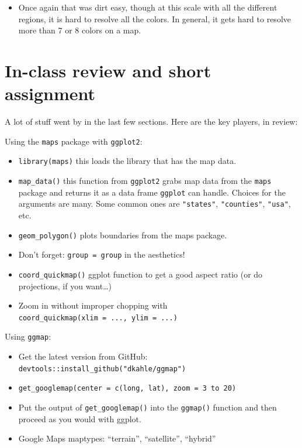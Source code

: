 \documentclass[]{book}
\providecommand{\tightlist}{%
  \setlength{\itemsep}{0pt}\setlength{\parskip}{0pt}}
\theoremstyle{definition}
\theoremstyle{definition}
\theoremstyle{remark}
\begin{document}
\begin{itemize}
\tightlist
\item
  Once again that was dirt easy, though at this scale with all the
  different regions, it is hard to resolve all the colors. In general,
  it gets hard to resolve more than 7 or 8 colors on a map.
\end{itemize}

\section{In-class review and short
assignment}\label{in-class-review-and-short-assignment}

A lot of stuff went by in the last few sections. Here are the key
players, in review:

Using the \texttt{maps} package with \texttt{ggplot2}:

\begin{itemize}
\tightlist
\item
  \texttt{library(maps)} this loads the library that has the map data.
\item
  \texttt{map\_data()} this function from \texttt{ggplot2} grabs map
  data from the \texttt{maps} package and returns it as a data frame
  \texttt{ggplot} can handle. Choices for the arguments are many. Some
  common ones are \texttt{"states"}, \texttt{"counties"},
  \texttt{"usa"}, etc.
\item
  \texttt{geom\_polygon()} plots boundaries from the maps package.
\item
  Don't forget: \texttt{group\ =\ group} in the aesthetics!
\item
  \texttt{coord\_quickmap()} ggplot function to get a good aspect ratio
  (or do projections, if you want\ldots{})
\item
  Zoom in without improper chopping with
  \texttt{coord\_quickmap(xlim\ =\ ...,\ ylim\ =\ ...)}
\end{itemize}

Using \texttt{ggmap}:

\begin{itemize}
\tightlist
\item
  Get the latest version from GitHub:
  \texttt{devtools::install\_github("dkahle/ggmap")}
\item
  \texttt{get\_googlemap(center\ =\ c(long,\ lat),\ zoom\ =\ 3\ to\ 20)}
\item
  Put the output of \texttt{get\_googlemap()} into the \texttt{ggmap()}
  function and then proceed as you would with ggplot.
\item
  Google Maps maptypes: ``terrain'', ``satellite'', ``hybrid''
\end{itemize}
\end{document}
